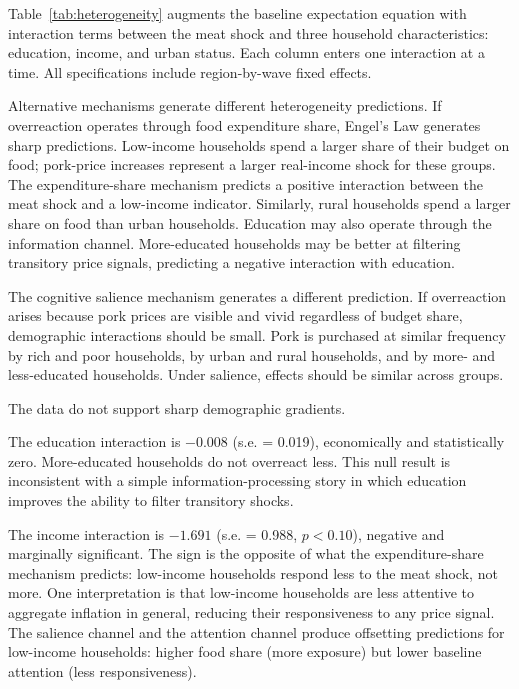 

Table~\ref{tab:heterogeneity} augments the baseline expectation
equation with interaction terms between the meat shock and three
household characteristics: education, income, and urban status.
Each column enters one interaction at a time.
All specifications include region-by-wave fixed effects.

Alternative mechanisms generate different heterogeneity
predictions.
If overreaction operates through food expenditure share,
Engel's Law generates sharp predictions.
Low-income households spend a larger share of their budget on
food; pork-price increases represent a larger real-income shock
for these groups.
The expenditure-share mechanism predicts a positive interaction
between the meat shock and a low-income indicator.
Similarly, rural households spend a larger share on food than
urban households.
Education may also operate through the information channel.
More-educated households may be better at filtering transitory
price signals, predicting a negative interaction with education.

The cognitive salience mechanism generates a different
prediction.
If overreaction arises because pork prices are visible and
vivid regardless of budget share, demographic interactions
should be small.
Pork is purchased at similar frequency by rich and poor
households, by urban and rural households, and by more- and
less-educated households.
Under salience, effects should be similar across groups.

The data do not support sharp demographic gradients.

The education interaction is $-0.008$ (s.e. = 0.019),
economically and statistically zero.
More-educated households do not overreact less.
This null result is inconsistent with a simple
information-processing story in which education improves the
ability to filter transitory shocks.

The income interaction is $-1.691$ (s.e. = 0.988, $p < 0.10$),
negative and marginally significant.
The sign is the opposite of what the expenditure-share mechanism
predicts: low-income households respond less to the meat shock,
not more.
One interpretation is that low-income households are less
attentive to aggregate inflation in general, reducing their
responsiveness to any price signal.
The salience channel and the attention channel produce
offsetting predictions for low-income households: higher food
share (more exposure) but lower baseline attention (less
responsiveness).

